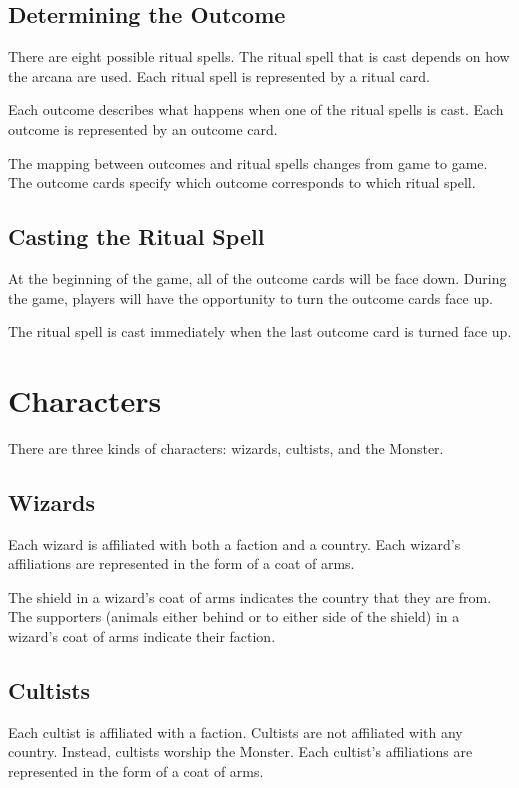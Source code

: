 \documentclass[10pt, parskip=half-, twoside]{scrartcl}
\begin{document}
\subsection*{Determining the Outcome}
There are eight possible ritual spells.
The ritual spell that is cast depends on how the arcana are used.
Each ritual spell is represented by a ritual card.

Each outcome describes what happens when one of the ritual spells is cast. 
Each outcome is represented by an outcome card.

The mapping between outcomes and ritual spells changes from game to game. The outcome cards specify which outcome corresponds to which ritual spell.

\subsection*{Casting the Ritual Spell}
At the beginning of the game, all of the outcome cards will be face down. During the game, players will have the opportunity to turn the outcome cards face up.

The ritual spell is cast immediately when the last outcome card is turned face up.

\newpage

\section*{Characters}
There are three kinds of characters: wizards, cultists, and the Monster.

\subsection*{Wizards}
Each wizard is affiliated with both a faction and a country. Each wizard's affiliations are represented in the form of a coat of arms.

The shield in a wizard's coat of arms indicates the country that they are from. The supporters (animals either behind or to either side of the shield) in a wizard's coat of arms indicate their faction.

\newpage

\subsection*{Cultists}
Each cultist is affiliated with a faction. Cultists are not affiliated with any country. Instead, cultists worship the Monster. Each cultist's affiliations are represented in the form of a coat of arms.
\end{document}
